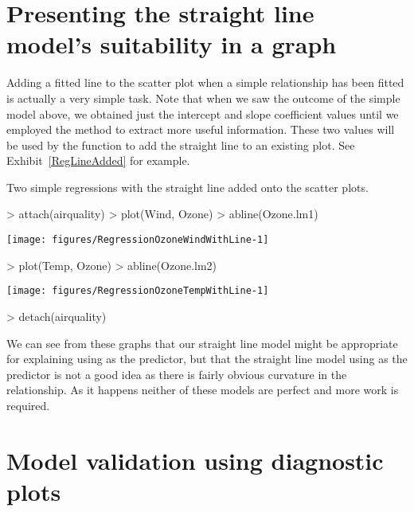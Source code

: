  
 
\section{Presenting the straight line model's suitability in a graph} 
\label{AddFittedLine} 
 
Adding a fitted line to the scatter plot when a simple relationship has been fitted is actually a very simple task. Note that when we saw the outcome of the simple model above, we obtained just the intercept and slope coefficient values until we employed the  method to extract more useful information. These two values will be used by the  function to add the straight line to an existing plot. See Exhibit~\ref{RegLineAdded} for example. 
\begin{exhibit} 
\begin{center} 
\caption{Two simple regressions with the straight line added onto the scatter plots.} 
\label{RegLineAdded} 
\begin{Schunk}
\begin{Sinput}
> attach(airquality) 
> plot(Wind, Ozone) 
> abline(Ozone.lm1) 
\end{Sinput}

\texttt{[image: figures/RegressionOzoneWindWithLine-1]} \end{Schunk}
\begin{Schunk}
\begin{Sinput}
> plot(Temp, Ozone) 
> abline(Ozone.lm2) 
\end{Sinput}

\texttt{[image: figures/RegressionOzoneTempWithLine-1]} \begin{Sinput}
> detach(airquality) 
\end{Sinput}
\end{Schunk}
\end{center} 
\end{exhibit} 
 
We can see from these graphs that our straight line model might be appropriate for explaining  using  as the predictor, but that the straight line model using  as the predictor is not a good idea as there is fairly obvious curvature in the relationship. As it happens neither of these models are perfect and more work is required. 
 
\section{Model validation using diagnostic plots} 
\label{RegValid}  
 
